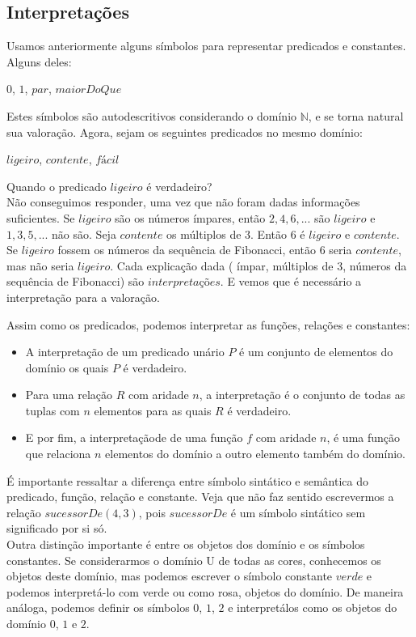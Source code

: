     \subsection{Interpretações}
    
    Usamos anteriormente alguns símbolos para representar predicados e constantes. Alguns deles:
    
    \begin{center}
        $0$, $1$, $ par$, $maiorDoQue$
    \end{center}
    
    
    Estes símbolos são autodescritivos considerando o domínio $\mathbb{N}$, e se torna natural sua valoração. Agora, sejam os seguintes predicados no mesmo domínio:
    
    \begin{center}
        $ligeiro$, $contente$, $fácil$
    \end{center}
    
    Quando o predicado $ligeiro$ é verdadeiro? \\
    Não conseguimos responder, uma vez que não foram dadas informações suficientes.
    Se $ligeiro$ são os números ímpares, então $2, 4, 6, ...$ são  $ligeiro$ e   $1, 3, 5, ...$ não são. Seja $contente$ os múltiplos de $3$. Então $6$ é $ligeiro$ e $contente$. Se $ligeiro$ fossem os números da sequência de Fibonacci, então $6$ seria $contente$, mas não seria $ligeiro$.
    Cada explicação dada ( ímpar, múltiplos de $3$, números da sequência de Fibonacci) são $interpretações$. E vemos que é necessário a interpretação para a valoração. 
    
    
    Assim como os predicados, podemos interpretar as funções, relações e constantes:
    
    \begin{itemize}
        \item A interpretação de um predicado unário $P$ é um conjunto de elementos do domínio os quais $P$ é verdadeiro. 
        \item Para uma relação $R$ com aridade $n$, a interpretação é o conjunto de todas as tuplas com $n$ elementos para as quais $R$ é verdadeiro.
        \item E por fim, a interpretaçãode de uma função $f$ com aridade $n$, é uma função que relaciona $n$ elementos do domínio a outro elemento também do domínio.\\
     \end{itemize}
     
     É importante ressaltar a diferença entre símbolo sintático e semântica do predicado, função, relação e constante. Veja que não faz sentido escrevermos a relação $sucessorDe(4,3)$, pois $sucessorDe$ é um símbolo sintático sem significado por si só. \\
     Outra distinção importante é entre os objetos dos domínio e os símbolos constantes. Se considerarmos o domínio U de todas as cores, conhecemos os objetos deste domínio, mas podemos escrever o símbolo constante $verde$ e podemos interpretá-lo com verde ou como rosa, objetos do domínio.
     De maneira análoga, podemos definir os símbolos $0$, $1$, $2$ e interpretálos como os objetos do domínio $0$, $1$ e $2$.
     

